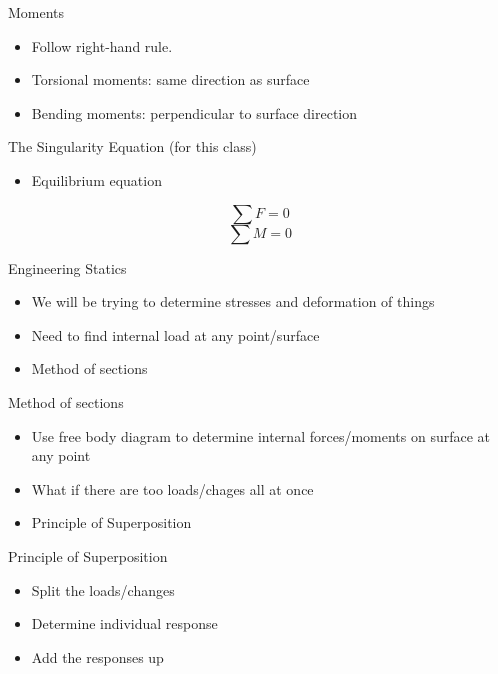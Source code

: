 \documentclass[10pt, svgnames]{beamer}
\begin{document}
\begin{frame}[label={sec:orge2d009f}]{Moments}
\begin{itemize}
\item Follow right-hand rule.

\item Torsional moments: same direction as surface

\item Bending moments: perpendicular to surface direction
\end{itemize}
\end{frame}

\begin{frame}[label={sec:orgf2b860f}]{The Singularity Equation (for this class)}
\begin{itemize}
\item Equilibrium equation
\end{itemize}

\[\sum F = 0\]
\[\sum M = 0\]
\end{frame}

\begin{frame}[label={sec:org3150ad7}]{Engineering Statics}
\begin{itemize}
\item We will be trying to determine stresses and deformation of things

\item Need to find internal load at any point/surface

\item Method of sections
\end{itemize}
\end{frame}

\begin{frame}[label={sec:orgae66ca4}]{Method of sections}
\begin{itemize}
\item Use free body diagram to determine internal forces/moments on surface
at any point

\item What if there are too loads/chages all at once

\item Principle of Superposition
\end{itemize}
\end{frame}

\begin{frame}[label={sec:org17071b6}]{Principle of Superposition}
\begin{itemize}
\item Split the loads/changes

\item Determine individual response

\item Add the responses up
\end{itemize}
\end{frame}
\end{document}
